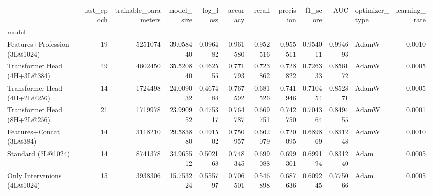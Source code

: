 \begin{tabular}{lrrrrrrrrrlr}
\toprule
{} &  last\_epoch &  trainable\_parameters &  model\_size &  log\_loss &  accuracy &    recall &  precision &  f1\_score &       AUC & optimizer\_type &  learning\_rate \\
model                         &             &                       &             &           &           &           &            &           &           &                &                \\
\midrule
Features+Profession (3L@1024) &          19 &               5251074 &   39.058440 &  0.096482 &  0.961580 &  0.952516 &   0.955511 &  0.954011 &  0.994693 &          AdamW &         0.0010 \\
Transformer Head (4H+3L@384)  &          49 &               4602450 &   35.520840 &  0.462555 &  0.771793 &  0.723862 &   0.728822 &  0.726333 &  0.856172 &          AdamW &         0.0005 \\
Transformer Head (4H+2L@256)  &          14 &               1724498 &   24.009032 &  0.467488 &  0.767592 &  0.681526 &   0.741946 &  0.710454 &  0.852871 &          AdamW &         0.0005 \\
Transformer Head (8H+2L@256)  &          21 &               1719978 &   23.990952 &  0.475317 &  0.764787 &  0.669751 &   0.742750 &  0.704364 &  0.849455 &          AdamW &         0.0001 \\
Features+Concat (3L@384)      &          14 &               3118210 &   29.583880 &  0.491502 &  0.750957 &  0.662079 &   0.720095 &  0.689869 &  0.831248 &          AdamW &         0.0010 \\
Standard (3L@1024)            &          14 &               8741378 &   34.965512 &  0.502168 &  0.748345 &  0.699088 &   0.699301 &  0.699194 &  0.831240 &           Adam &         0.0005 \\
Only Intervenions (4L@1024)   &          15 &               3938306 &   15.753224 &  0.555797 &  0.706501 &  0.546898 &   0.687636 &  0.609245 &  0.775066 &           Adam &         0.0005 \\
\bottomrule
\end{tabular}
